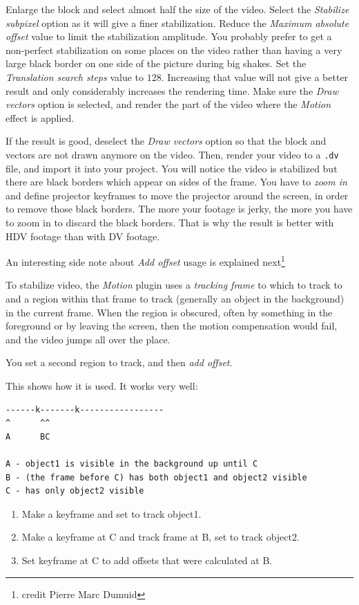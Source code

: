 Enlarge the block and select almost half the size of the video. Select the \textit{Stabilize subpixel} option as it will give a finer stabilization. Reduce the \textit{Maximum absolute offset} value to limit the stabilization amplitude. You probably prefer to get a non-perfect stabilization on some places on the video rather than having a very large black border on one side of the picture during big shakes. Set the \textit{Translation search steps} value to $128$. Increasing that value will not give a better result and only considerably increases the rendering time. Make sure the \textit{Draw vectors} option is selected, and render the part of the video where the \textit{Motion} effect is applied.

If the result is good, deselect the \textit{Draw vectors} option so that the block and vectors are not drawn anymore on the video. Then, render your video to a \texttt{.dv} file, and import it into your project. You will notice the video is stabilized but there are black borders which appear on sides of the frame. You have to \textit{zoom in} and define projector keyframes to move the projector around the screen, in order to remove those black borders. The more your footage is jerky, the more you have to zoom in to discard the black borders. That is why the result is better with HDV footage than with DV footage.

An interesting side note about \textit{Add offset} usage is explained next\protect\footnote{credit Pierre Marc Dumuid}

To stabilize video, the \textit{Motion} plugin uses a \textit{tracking frame} to which to track to and a region within that frame to track (generally an object in the background) in the current frame.  When the region is obscured, often by something in the foreground or by leaving the screen, then the motion compensation would fail, and the video jumps all over the place.

You set a second region to track, and then \textit{add offset}.

This shows how it is used.  It works very well:

\begin{verbatim}
------k-------k-----------------
^      ^^
A      BC

A - object1 is visible in the background up until C
B - (the frame before C) has both object1 and object2 visible
C - has only object2 visible
\end{verbatim}

\begin{enumerate}
    \item Make a keyframe and set to track object1.
    \item Make a keyframe at C and track frame at B, set to track object2.
    \item Set keyframe at C to add offsets that were calculated at B.
\end{enumerate}

